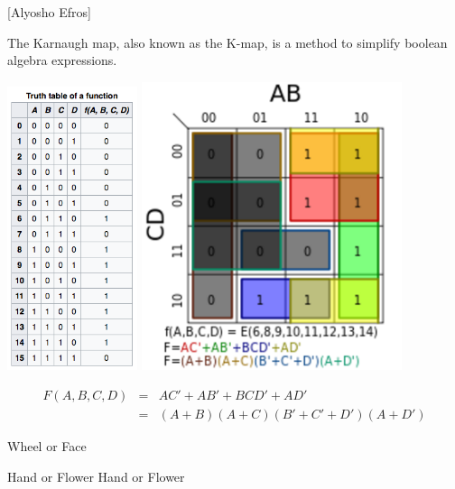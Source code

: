 {\centerline{[Alyosho Efros]}


The Karnaugh map, also known as the K-map, is a method to simplify boolean algebra expressions.

\vfil
\centerline{\includegraphics[width = 1.5in]{../images/Kmap1} \hspace{1.0in} \includegraphics[width=3.0in]{../images/Kmap2}}

\begin{eqnarray*}
  F(A,B,C,D) & = & AC' + AB' + BCD' + AD' \\
  & = & (A+B)(A+C)(B' + C' + D')(A+D')
\end{eqnarray*}


{\color{red}
  
\centerline{Wheel or Face}

\vfill
\centerline{Hand or Flower \hspace{2.5in} Hand or Flower}

}}
